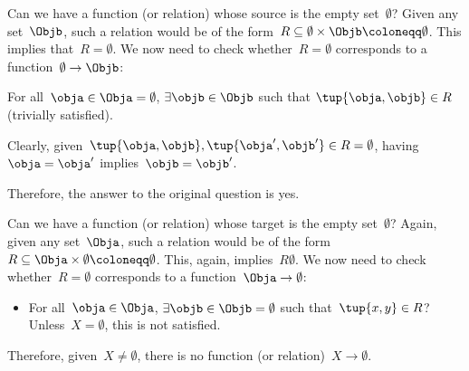 \begin{example}
  Can we have a function (or relation) whose source is the empty set~$\emptyset$? Given any set~$\Objb$, such a relation would be of the form~$R\subseteq \emptyset \times \Objb \coloneqq \emptyset$. This implies that~$R=\emptyset$. We now need to check whether~$R=\emptyset$ corresponds to a function~$\emptyset\to \Objb$:
  \begin{compactitem}
    \item For all~$\obja\in \Obja=\emptyset$, $\exists \objb \in \Objb$ such that $\tup{\obja,\objb}\in R$ (trivially satisfied).
    \item Clearly, given~$\tup{\obja,\objb}, \tup{\obja',\objb'}\in R=\emptyset$, having~$\obja=\obja'$ implies~$\objb=\objb'$.
  \end{compactitem}
  Therefore, the answer to the original question is yes.
\end{example}

\begin{example}
  Can we have a function (or relation) whose target is the empty set~$\emptyset$? Again, given any set~$\Obja$, such a relation would be of the form~$R\subseteq \Obja\times \emptyset\coloneqq \emptyset$. This, again, implies~$R\emptyset$. We now need to check whether~$R=\emptyset$ corresponds to a function~$\Obja \to \emptyset$:
  \begin{itemize}
    \item For all~$\obja\in \Obja$, $\exists \objb\in \Objb=\emptyset$ such that~$\tup{x,y}\in R$? Unless~$X=\emptyset$, this is not satisfied.
  \end{itemize}
  Therefore, given~$X\neq \emptyset$, there is no function (or relation)~$X\to \emptyset$.
\end{example}
